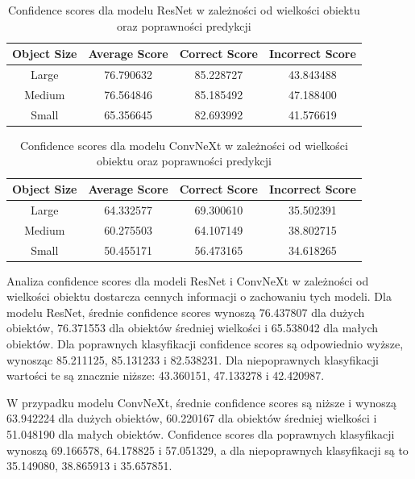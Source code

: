\begin{table}
	\centering
	\begin{tabular}{|c|c|c|c|}
		\hline
		\textbf{Object Size} & \textbf{Average Score} & \textbf{Correct Score} & \textbf{Incorrect Score} \\
		\hline
		Large & 76.790632 & 85.228727 & 43.843488 \\
		\hline
		Medium & 76.564846 & 85.185492 & 47.188400 \\
		\hline
		Small & 65.356645 & 82.693992 & 41.576619 \\
		\hline
	\end{tabular}
	\caption{Confidence scores dla modelu ResNet w zależności od wielkości obiektu oraz poprawności predykcji}
	\label{tab:resnet_confidence_scores}
\end{table}

\begin{table}
	\centering
	\begin{tabular}{|c|c|c|c|}
		\hline
		\textbf{Object Size} & \textbf{Average Score} & \textbf{Correct Score} & \textbf{Incorrect Score} \\
		\hline
		Large & 64.332577 & 69.300610 & 35.502391 \\
		\hline
		Medium & 60.275503 & 64.107149 & 38.802715 \\
		\hline
		Small & 50.455171 & 56.473165 & 34.618265 \\
		\hline
	\end{tabular}
	\caption{Confidence scores dla modelu ConvNeXt w zależności od wielkości obiektu oraz poprawności predykcji}
	\label{tab:convnext_confidence_scores}
\end{table}

Analiza confidence scores dla modeli ResNet i ConvNeXt w zależności od wielkości obiektu dostarcza cennych informacji o zachowaniu tych modeli. 
Dla modelu ResNet, średnie confidence scores wynoszą 76.437807 dla dużych obiektów, 76.371553 dla obiektów średniej wielkości i 65.538042 dla 
małych obiektów. Dla poprawnych klasyfikacji confidence scores są odpowiednio wyższe, wynosząc 85.211125, 85.131233 i 82.538231. Dla niepoprawnych 
klasyfikacji wartości te są znacznie niższe: 43.360151, 47.133278 i 42.420987.

W przypadku modelu ConvNeXt, średnie confidence scores są niższe i wynoszą 63.942224 dla dużych obiektów, 60.220167 dla obiektów średniej 
wielkości i 51.048190 dla małych obiektów. Confidence scores dla poprawnych klasyfikacji wynoszą 69.166578, 64.178825 i 57.051329, a dla 
niepoprawnych klasyfikacji są to 35.149080, 38.865913 i 35.657851.

